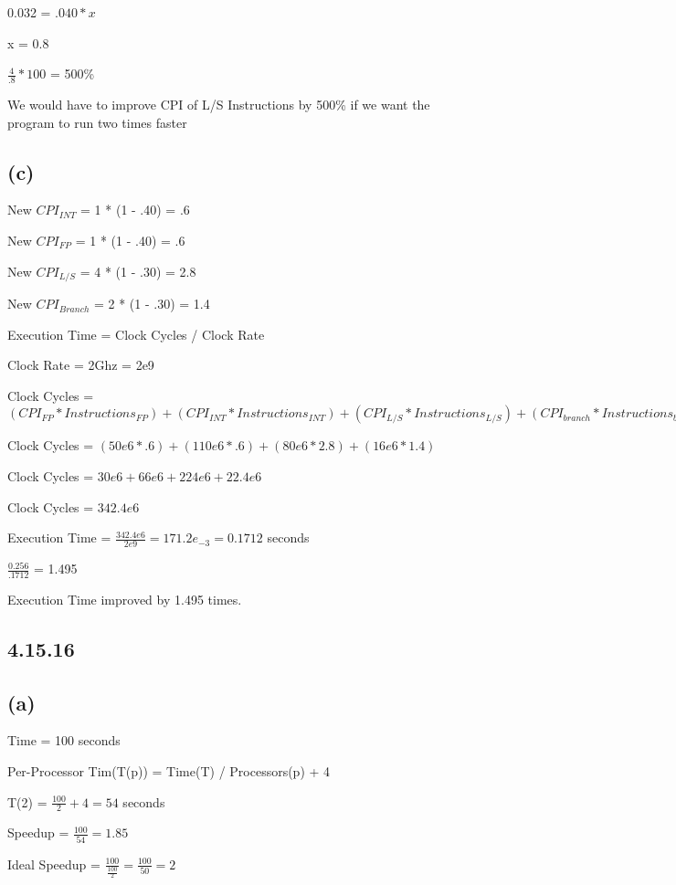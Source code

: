 \documentclass{article}
\begin{document}
    0.032 = $.040 * x$

    x = 0.8

    $\frac{4}{.8} * 100$ = 500\%

    We would have to improve CPI of L/S Instructions by 500\% if we want the program to run two times faster

    \subsection*{(c)}

    New $CPI_{INT}$ = 1 * (1 - .40) = .6

    New $CPI_{FP}$ = 1 * (1 - .40) = .6

    New $CPI_{L/S}$ = 4 * (1 - .30) = 2.8

    New $CPI_{Branch}$ = 2 * (1 - .30) = 1.4

    Execution Time = Clock Cycles / Clock Rate

    Clock Rate = 2Ghz = 2e9

    Clock Cycles = $(CPI_{FP} * Instructions_{FP}) + (CPI_{INT} * Instructions_{INT}) + (CPI_{L/S} * Instructions_{L/S}) + (CPI_{branch}* Instructions_{branch})$

    Clock Cycles = $(50e6 * .6) + (110e6 * .6) + (80e6 * 2.8) + (16e6 * 1.4)$

    Clock Cycles = $30e6 + 66e6 + 224e6 + 22.4e6$

    Clock Cycles = $342.4e6$

    Execution Time = $\frac{342.4e6}{2e9} = 171.2e_{-3} = 0.1712$ seconds

    $\frac{0.256}{.1712}$ = 1.495

    Execution Time improved by 1.495 times.

    \subsection*{4.15.16}
    
    \subsection*{(a)}

    Time = 100 seconds

    Per-Processor Tim(T(p)) = Time(T) / Processors(p) + 4

    T(2) = $\frac{100}{2} + 4 = 54$ seconds

    Speedup = $\frac{100}{54} = 1.85$ 

    Ideal Speedup = $\frac{100}{\frac{100}{2}} = \frac{100}{50} = 2$
\end{document}
